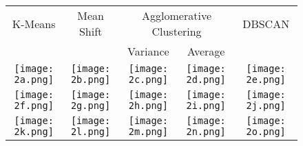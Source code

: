 \begingroup
	\def\arraystretch{1.5}
	\begin{figure}[H]
		\centering
		\begin{tabular}{|c|c|c|c|c|}
			\hline
			K-Means & Mean Shift & \multicolumn{2}{|c|}{Agglomerative Clustering} & DBSCAN \\
			\cline{3-4}
			& & Variance & Average & \\
			\hline
			\texttt{[image: 2a.png]} &
			\texttt{[image: 2b.png]} &
			\texttt{[image: 2c.png]} &
			\texttt{[image: 2d.png]} &
			\texttt{[image: 2e.png]} \\
			\hline
			\texttt{[image: 2f.png]} &
			\texttt{[image: 2g.png]} &
			\texttt{[image: 2h.png]} &
			\texttt{[image: 2i.png]} &
			\texttt{[image: 2j.png]} \\
			\hline
			\texttt{[image: 2k.png]} &
			\texttt{[image: 2l.png]} &
			\texttt{[image: 2m.png]} &
			\texttt{[image: 2n.png]} &
			\texttt{[image: 2o.png]} \\
			\hline
		\end{tabular}
	\end{figure}
\endgroup